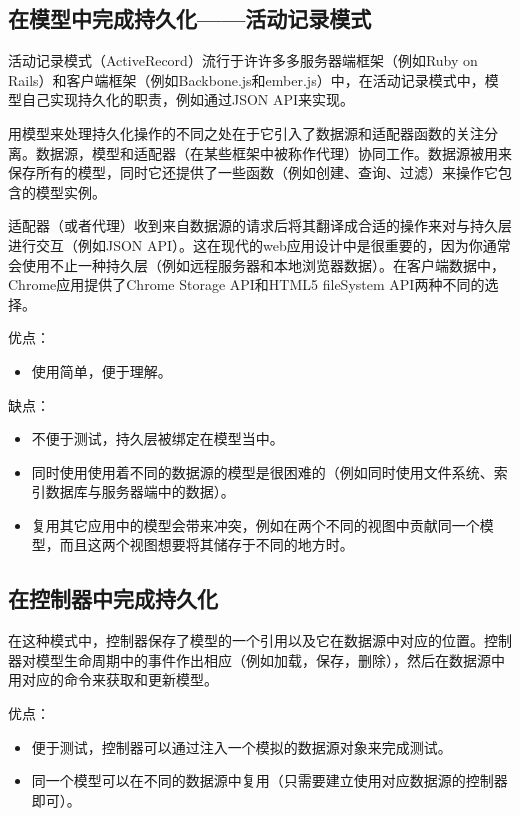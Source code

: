 \subsection{在模型中完成持久化——活动记录模式}
活动记录模式（ActiveRecord）流行于许许多多服务器端框架（例如Ruby on Rails）和客户端框架（例如Backbone.js和ember.js）中，在活动记录模式中，模型自己实现持久化的职责，例如通过JSON API来实现。

用模型来处理持久化操作的不同之处在于它引入了数据源和适配器函数的关注分离。数据源，模型和适配器（在某些框架中被称作代理）协同工作。数据源被用来保存所有的模型，同时它还提供了一些函数（例如创建、查询、过滤）来操作它包含的模型实例。

适配器（或者代理）收到来自数据源的请求后将其翻译成合适的操作来对与持久层进行交互（例如JSON API）。这在现代的web应用设计中是很重要的，因为你通常会使用不止一种持久层（例如远程服务器和本地浏览器数据）。在客户端数据中，Chrome应用提供了Chrome Storage API和HTML5 fileSystem API两种不同的选择。

优点：
\begin{itemize}
  \item 使用简单，便于理解。
\end{itemize}

缺点：
\begin{itemize}
  \item 不便于测试，持久层被绑定在模型当中。
  \item 同时使用使用着不同的数据源的模型是很困难的（例如同时使用文件系统、索引数据库与服务器端中的数据）。
  \item 复用其它应用中的模型会带来冲突，例如在两个不同的视图中贡献同一个模型，而且这两个视图想要将其储存于不同的地方时。
\end{itemize}


\subsection{在控制器中完成持久化}
在这种模式中，控制器保存了模型的一个引用以及它在数据源中对应的位置。控制器对模型生命周期中的事件作出相应（例如加载，保存，删除），然后在数据源中用对应的命令来获取和更新模型。

优点：
\begin{itemize}
  \item 便于测试，控制器可以通过注入一个模拟的数据源对象来完成测试。
  \item 同一个模型可以在不同的数据源中复用（只需要建立使用对应数据源的控制器即可）。
\end{itemize}

